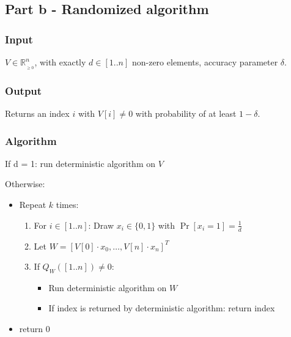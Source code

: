 \subsection*{Part b - Randomized algorithm}

\subsubsection*{Input}

$V \in \mathbb{R}_{_{\geq 0}}^n$, with exactly $d \in [1..n]$ non-zero elements, accuracy parameter $\delta$.

\subsubsection*{Output}

Returns an index $i$ with $V[i] \neq 0$ with probability of at least $1 - \delta$.

\subsubsection*{Algorithm}

If d = 1: run deterministic algorithm on $V$

Otherwise:
\begin{itemize}
    \item Repeat $k$ times:
    \begin{enumerate}
        \item For $i \in [1..n]$: Draw $x_i \in \{0, 1\}$ with $\Pr[x_i = 1] = \frac{1}{d}$ 
        
        \item Let $W = [V[0]\cdot x_0,\dots,V[n] \cdot x_n ]^T$
        
        \item If $Q_W([1..n]) \neq 0$:
                
        \begin{itemize}
            \item Run deterministic algorithm on $W$
            
            \item If index is returned by deterministic algorithm: return index
            
        \end{itemize}
        
    \end{enumerate} 
    
    \item return $0$
\end{itemize} 

